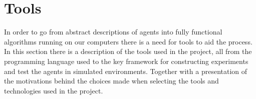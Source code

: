 \section{Tools }
\label{sec:tools}
In order to go from abstract descriptions of agents into fully functional algorithms running on our computers there is a need for tools to aid the process. In this section there is a description of the tools used in the project, all from the programming language used to the key framework for constructing experiments and test the agents in simulated environments. Together with a presentation of the motivations behind the choices made when selecting the tools and technologies used in the project.





